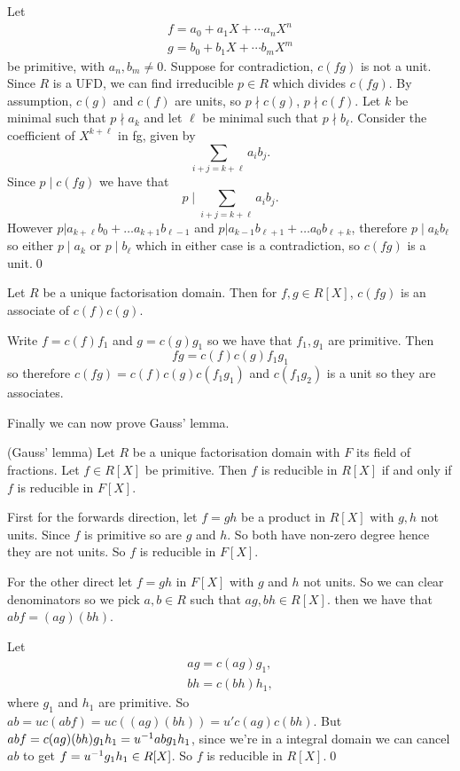 \documentclass{article}
\begin{document}
\pf Let
\begin{gather*}
  f=a_0+a_1X+\cdots a_nX^n \\
  g=b_0+b_1X+\cdots b_mX^m
\end{gather*}
be primitive, with $ a_n,b_m\ne 0 $. Suppose for contradiction, $ c(fg) $ is not a unit. Since $ R $ is a UFD, we can find irreducible $ p\in R $ which divides $ c(fg) $. By assumption, $ c(g) $ and $ c(f) $ are units, so $ p\nmid c(g) $, $ p\nmid c(f) $. Let $ k $ be minimal such that $ p\nmid a_k $ and let $ \ell $ be minimal such that $ p\nmid b_\ell $. Consider the coefficient of $ X^{k+\ell} $ in fg, given by
\[
	\sum_{i+j=k+\ell}a_ib_j.
\]
Since $ p\mid c(fg) $ we have that
\[
	p\mid \sum_{i+j=k+\ell}a_ib_j.
\]
However $ p|a_{k+\ell}b_0+\dots a_{k+1}b_{\ell -1} $ and $ p |a_{k-1}b_{\ell +1} + \dots a_0b_{\ell +k} $, therefore $ p\mid a_kb_\ell $ so either $ p\mid a_k $ or $ p\mid b_\ell $ which in either case is a contradiction, so $ c(fg) $ is a unit.\qed
\begin{corollary}
	Let $ R $ be a unique factorisation domain. Then for $ f,g\in R[X] $, $ c(fg) $ is an associate of $ c(f)c(g) $.
\end{corollary}
\pf Write $ f=c(f)f_1 $ and $ g=c(g)g_1 $ so we have that $ f_1,g_1 $ are primitive. Then 
\[
  fg=c(f)c(g)f_1g_1
\]
so therefore $ c(fg)=c(f)c(g)c(f_1g_1) $ and $ c(f_1g_2) $ is a unit so they are associates.
\par Finally we can now prove Gauss' lemma.
\begin{lemma}
	(Gauss' lemma) Let $ R $ be a unique factorisation domain with $ F $ its field of fractions. Let $ f\in R[X] $ be primitive. Then $ f $ is reducible in $ R[X] $ if and only if $ f $ is reducible in $ F[X] $.
\end{lemma}
\pf First for the forwards direction, let $ f=gh $ be a product in $ R[X] $ with $ g,h $ not units. Since $ f $ is primitive so are $ g $ and $ h $. So both have non-zero degree hence they are not units. So $ f $ is reducible in $ F[X] $.\par
For the other direct let $ f=gh $ in $ F[X] $ with $ g $ and $ h $ not units. So we can clear denominators so we pick $ a,b\in R $ such that $ ag,bh\in R[X] $. then we have that $ abf=(ag)(bh) $.\par
Let
\begin{gather*}
  ag=c(ag)g_1,\\
  bh=c(bh)h_1,
\end{gather*}
where $ g_1 $ and $ h_1 $ are primitive. So $ ab=uc(abf)=uc((ag)(bh))=u'c(ag)c(bh) $. But $ abf=c(ag)(bh)g_1h_1={u}^{-1} abg_1h_1 $, since we're in a integral domain we can cancel $ ab $ to get $ f={u}^{-1} g_1h_1\in R[X] $. So $ f $ is reducible in $ R[X] $.\qed\par
\end{document}
